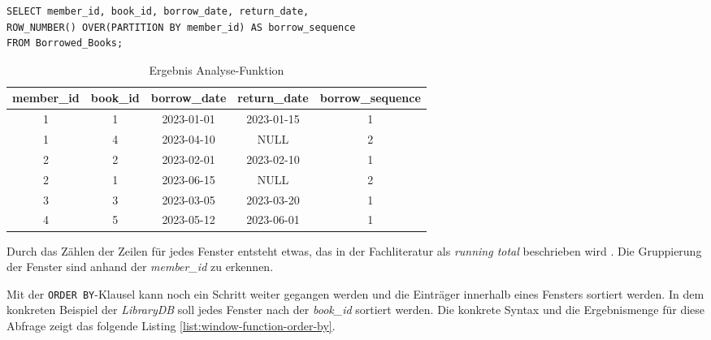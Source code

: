 \begin{lstlisting}
SELECT member_id, book_id, borrow_date, return_date,
ROW_NUMBER() OVER(PARTITION BY member_id) AS borrow_sequence
FROM Borrowed_Books;
\end{lstlisting}
\begin{table}[h]
	\centering
	\begin{tabular}{|c|c|c|c|c|}
		\hline
		\textbf{member\_id} & \textbf{book\_id} & \textbf{borrow\_date} & \textbf{return\_date} & \textbf{borrow\_sequence} \\
		\hline
		1                   & 1                 & 2023-01-01            & 2023-01-15            & 1                         \\
		\hline
		1                   & 4                 & 2023-04-10            & NULL                  & 2                         \\
		\hline
		2                   & 2                 & 2023-02-01            & 2023-02-10            & 1                         \\
		\hline
		2                   & 1                 & 2023-06-15            & NULL                  & 2                         \\
		\hline
		3                   & 3                 & 2023-03-05            & 2023-03-20            & 1                         \\
		\hline
		4                   & 5                 & 2023-05-12            & 2023-06-01            & 1                         \\
		\hline
	\end{tabular}
	\caption{Ergebnis Analyse-Funktion}
	\label{tab:ergebnnis_analyse_funktion}
\end{table}

Durch das Zählen der Zeilen für jedes Fenster entsteht etwas, das in der Fachliteratur
als \textit{running total} beschrieben wird \citep[vgl.][S. 37]{Nuijten2023}.
Die Gruppierung der Fenster sind anhand der \textit{member\_id} zu erkennen.

Mit der \texttt{ORDER BY}-Klausel kann noch ein Schritt weiter gegangen werden
und die Einträger innerhalb eines Fensters sortiert werden. In dem konkreten Beispiel
der \textit{LibraryDB} soll jedes Fenster nach der \textit{book\_id} sortiert werden.
Die konkrete Syntax und die Ergebnismenge für diese Abfrage zeigt das folgende
Listing \ref{list:window-function-order-by}.

